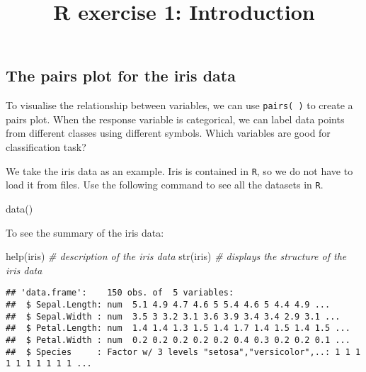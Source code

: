 \documentclass[
]{article}
\title{R exercise 1: Introduction}
\author{}
\date{\vspace{-2.5em}}
\newenvironment{Shaded}{\begin{snugshade}}{\end{snugshade}}
\newcommand{\CommentTok}[1]{\textcolor[rgb]{0.56,0.35,0.01}{\textit{#1}}}
\newcommand{\FunctionTok}[1]{\textcolor[rgb]{0.00,0.00,0.00}{#1}}
\newcommand{\NormalTok}[1]{#1}
\newcommand{\SpecialCharTok}[1]{\textcolor[rgb]{0.00,0.00,0.00}{#1}}
\begin{document}
\maketitle

\hypertarget{the-pairs-plot-for-the-iris-data}{%
\subsection{The pairs plot for the iris
data}\label{the-pairs-plot-for-the-iris-data}}

To visualise the relationship between variables, we can use
\texttt{pairs(\ )} to create a pairs plot. When the response variable is
categorical, we can label data points from different classes using
different symbols. Which variables are good for classification task?

We take the iris data as an example. Iris is contained in \texttt{R}, so
we do not have to load it from files. Use the following command to see
all the datasets in \texttt{R}.

\begin{Shaded}
\begin{Highlighting}[]
\FunctionTok{data}\NormalTok{()}
\end{Highlighting}
\end{Shaded}

To see the summary of the iris data:

\begin{Shaded}
\begin{Highlighting}[]
\FunctionTok{help}\NormalTok{(iris) }\CommentTok{\# description of the iris data}
\FunctionTok{str}\NormalTok{(iris) }\CommentTok{\# displays the structure of the iris data}
\end{Highlighting}
\end{Shaded}

\begin{verbatim}
## 'data.frame':    150 obs. of  5 variables:
##  $ Sepal.Length: num  5.1 4.9 4.7 4.6 5 5.4 4.6 5 4.4 4.9 ...
##  $ Sepal.Width : num  3.5 3 3.2 3.1 3.6 3.9 3.4 3.4 2.9 3.1 ...
##  $ Petal.Length: num  1.4 1.4 1.3 1.5 1.4 1.7 1.4 1.5 1.4 1.5 ...
##  $ Petal.Width : num  0.2 0.2 0.2 0.2 0.2 0.4 0.3 0.2 0.2 0.1 ...
##  $ Species     : Factor w/ 3 levels "setosa","versicolor",..: 1 1 1 1 1 1 1 1 1 1 ...
\end{verbatim}

\begin{Shaded}
\end{Shaded}
\end{document}
